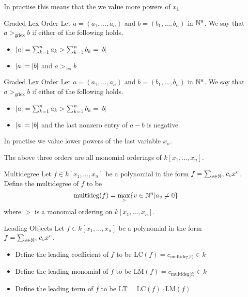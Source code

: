 \documentclass[a4paper]{article}
\begin{document}
In practise this means that the we value more powers of $x_1$

\begin{defn}{Graded Lex Order}{} Let $a=(a_1,\dots,a_n)$ and $b=(b_1,\dots,b_n)$ in $\mathbb{N}^n$. We say that $a>_{\text{grlex}}b$ if either of the following holds. 
\begin{itemize}
\item $\abs{a}=\sum_{k=1}^na_k>\sum_{k=1}^nb_k=\abs{b}$
\item $\abs{a}=\abs{b}$ and $a>_{\text{lex}}b$
\end{itemize}
\end{defn}

\begin{defn}{Graded Lex Order}{} Let $a=(a_1,\dots,a_n)$ and $b=(b_1,\dots,b_n)$ in $\mathbb{N}^n$. We say that $a>_{\text{grlex}}b$ if either of the following holds. 
\begin{itemize}
\item $\abs{a}=\sum_{k=1}^na_k>\sum_{k=1}^nb_k=\abs{b}$
\item $\abs{a}=\abs{b}$ and the last nonzero entry of $a-b$ is negative. 
\end{itemize}
\end{defn}

In practise we value lower powers of the last variable $x_n$. 

\begin{prp}{}{} The above three orders are all monomial orderings of $k[x_1,\dots,x_n]$. 
\end{prp}

\begin{defn}{Multidegree}{} Let $f\in k[x_1,\dots,x_n]$ be a polynomial in the form $f=\sum_{v\in\mathbb{N}^n}c_vx^v$. Define the multidegree of $f$ to be $$\text{multideg}(f)=\max_>\{v\in\mathbb{N}^n|a_v\neq 0\}$$ where $>$ is a monomial ordering on $k[x_1,\dots,x_n]$. 
\end{defn}

\begin{defn}{Leading Objects}{} Let $f\in k[x_1,\dots,x_n]$ be a polynomial in the form $f=\sum_{v\in\mathbb{N}^n}c_vx^v$. 
\begin{itemize}
\item Define the leading coefficient of $f$ to be $\text{LC}(f)=c_\text{multideg(f)}\in k$
\item Define the leading monomial of $f$ to be $\text{LM}(f)=c_\text{multideg(f)}\in k$
\item Define the leading term of $f$ to be $\text{LT}=\text{LC}(f)\cdot\text{LM}(f)$
\end{itemize}
\end{defn}
\end{document}
